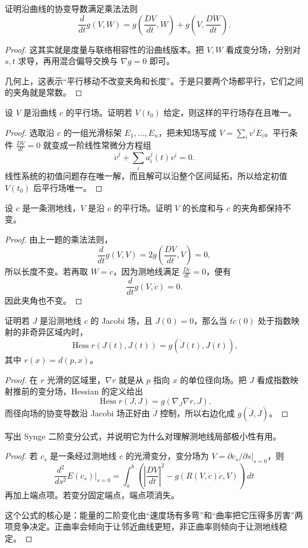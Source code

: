 \documentclass[11pt,a4paper,openany]{ctexbook}
\numberwithin{equation}{chapter}
\begin{document}
\begin{exercise}
证明沿曲线的协变导数满足乘法法则
\[
\frac{d}{dt}g(V,W)=g\!\left(\frac{DV}{dt},W\right)+g\!\left(V,\frac{DW}{dt}\right).
\]
\end{exercise}
\begin{proof}
这其实就是度量与联络相容性的沿曲线版本。把 \(V,W\) 看成变分场，分别对 \(s,t\) 求导，再用混合偏导交换与 \(\nabla g=0\) 即可。

几何上，这表示“平行移动不改变夹角和长度”。于是只要两个场都平行，它们之间的夹角就是常数。
\end{proof}

\begin{exercise}
设 \(V\) 是沿曲线 \(c\) 的平行场。证明若 \(V(t_0)\) 给定，则这样的平行场存在且唯一。
\end{exercise}
\begin{proof}
选取沿 \(c\) 的一组光滑标架 \(E_1,\dots,E_n\)，把未知场写成 \(V=\sum_i v^iE_i\)。平行条件 \(\frac{DV}{dt}=0\) 就变成一阶线性常微分方程组
\[
\dot v^j+\sum_i a_i^j(t)v^i=0.
\]
线性系统的初值问题存在唯一解，而且解可以沿整个区间延拓，所以给定初值 \(V(t_0)\) 后平行场唯一。
\end{proof}

\begin{exercise}
设 \(c\) 是一条测地线，\(V\) 是沿 \(c\) 的平行场。证明 \(V\) 的长度和与 \(c\) 的夹角都保持不变。
\end{exercise}
\begin{proof}
由上一题的乘法法则，
\[
\frac{d}{dt}g(V,V)=2g\!\left(\frac{DV}{dt},V\right)=0,
\]
所以长度不变。若再取 \(W=\dot c\)，因为测地线满足 \(\frac{D\dot c}{dt}=0\)，便有
\[
\frac{d}{dt}g(V,\dot c)=0.
\]
因此夹角也不变。
\end{proof}

\begin{exercise}
证明若 \(J\) 是沿测地线 \(c\) 的 Jacobi 场，且 \(J(0)=0\)，那么当 \(t\dot c(0)\) 处于指数映射的非奇异区域内时，
\[
\operatorname{Hess}r(J(t),J(t))=g(\dot J(t),J(t)),
\]
其中 \(r(x)=d(p,x)\)。
\end{exercise}
\begin{proof}
在 \(r\) 光滑的区域里，\(\nabla r\) 就是从 \(p\) 指向 \(x\) 的单位径向场。把 \(J\) 看成指数映射推前的变分场，Hessian 的定义给出
\[
\operatorname{Hess}r(J,J)=g(\nabla_J\nabla r,J).
\]
而径向场的协变导数沿 Jacobi 场正好由 \(\dot J\) 控制，所以右边化成 \(g(\dot J,J)\)。
\end{proof}

\begin{exercise}
写出 Synge 二阶变分公式，并说明它为什么对理解测地线局部极小性有用。
\end{exercise}
\begin{proof}
若 \(c_s\) 是一条经过测地线 \(c\) 的光滑变分，变分场为 \(V=\partial c_s/\partial s|_{s=0}\)，则
\[
\frac{d^2}{ds^2}E(c_s)\Big|_{s=0}
=\int_a^b \left(\left|\frac{DV}{dt}\right|^2-g(R(V,\dot c)\dot c,V)\right)\,dt
\]
再加上端点项。若变分固定端点，端点项消失。

这个公式的核心是：能量的二阶变化由“速度场有多弯”和“曲率把它压得多厉害”两项竞争决定。正曲率会倾向于让邻近曲线更短，非正曲率则倾向于让测地线稳定。
\end{proof}
\end{document}

